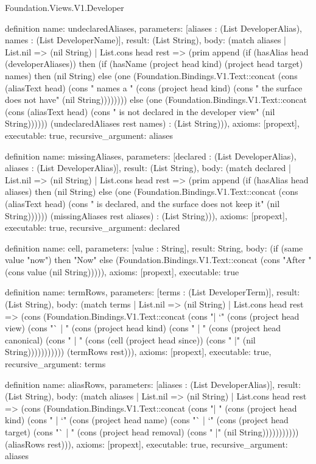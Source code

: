 \begin{lexlean}{Foundation.Views.V1.Developer}
\begin{semanticmodule}
definition{
  name: undeclaredAliases,
  parameters: [aliases : (List DeveloperAlias), names : (List DeveloperName)],
  result: (List String),
  body: (match aliases
    | List.nil => (nil String)
    | List.cons head rest => (prim append (if (hasAlias head (developerAliases)) then (if (hasName (project head kind) (project head target) names) then (nil String) else (one (Foundation.Bindings.V1.Text::concat (cons (aliasText head) (cons " names a " (cons (project head kind) (cons " the surface does not have" (nil String)))))))) else (one (Foundation.Bindings.V1.Text::concat (cons (aliasText head) (cons " is not declared in the developer view" (nil String)))))) (undeclaredAliases rest names) : (List String))),
  axioms: [propext],
  executable: true,
  recursive_argument: aliases
}

definition{
  name: missingAliases,
  parameters: [declared : (List DeveloperAlias), aliases : (List DeveloperAlias)],
  result: (List String),
  body: (match declared
    | List.nil => (nil String)
    | List.cons head rest => (prim append (if (hasAlias head aliases) then (nil String) else (one (Foundation.Bindings.V1.Text::concat (cons (aliasText head) (cons " is declared, and the surface does not keep it" (nil String)))))) (missingAliases rest aliases) : (List String))),
  axioms: [propext],
  executable: true,
  recursive_argument: declared
}

definition{
  name: cell,
  parameters: [value : String],
  result: String,
  body: (if (same value "now") then "Now" else (Foundation.Bindings.V1.Text::concat (cons "After " (cons value (nil String))))),
  axioms: [propext],
  executable: true
}

definition{
  name: termRows,
  parameters: [terms : (List DeveloperTerm)],
  result: (List String),
  body: (match terms
    | List.nil => (nil String)
    | List.cons head rest => (cons (Foundation.Bindings.V1.Text::concat (cons "| `" (cons (project head view) (cons "` | " (cons (project head kind) (cons " | " (cons (project head canonical) (cons " | " (cons (cell (project head since)) (cons " |" (nil String))))))))))) (termRows rest))),
  axioms: [propext],
  executable: true,
  recursive_argument: terms
}

definition{
  name: aliasRows,
  parameters: [aliases : (List DeveloperAlias)],
  result: (List String),
  body: (match aliases
    | List.nil => (nil String)
    | List.cons head rest => (cons (Foundation.Bindings.V1.Text::concat (cons "| " (cons (project head kind) (cons " | `" (cons (project head name) (cons "` | `" (cons (project head target) (cons "` | " (cons (project head removal) (cons " |" (nil String))))))))))) (aliasRows rest))),
  axioms: [propext],
  executable: true,
  recursive_argument: aliases
}


\end{semanticmodule}
\end{lexlean}
